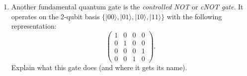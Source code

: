 \documentclass[letterpaper,11pt]{article}
\begin{document}
\begin{enumerate}
\begin{enumerate}
    \item Another fundamental quantum gate is the \textit{controlled NOT} or \textit{cNOT gate}. It operates on the 2-qubit basis $\{|00\rangle ,|01\rangle ,|10\rangle ,|11\rangle\}$ with the following representation:
    $$ \left( \begin{array}{cccc} 1 & 0 & 0 & 0 \\ 0 & 1 & 0 & 0 \\ 0 & 0 & 0 & 1 \\ 0 & 0 & 1 & 0 \end{array} \right). $$
    Explain what this gate does (and where it gets its name).
  \end{enumerate}
\end{enumerate}
\end{document}
